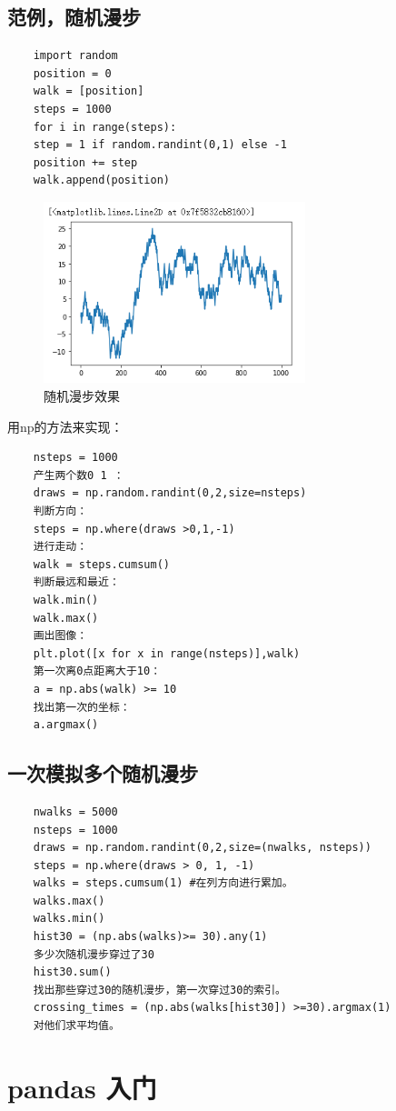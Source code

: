 \documentclass{article}
\begin{document}
\subsection{范例，随机漫步}
\begin{lstlisting}
	import random
	position = 0
	walk = [position]
	steps = 1000
	for i in range(steps):
	step = 1 if random.randint(0,1) else -1
	position += step
	walk.append(position)
\end{lstlisting}
	\begin{figure}[htpb]
		\centering
		\includegraphics[width=3in]{fig/np_9}
		\caption{随机漫步效果}
	\end{figure}
用np的方法来实现：
\begin{lstlisting}
	nsteps = 1000
	产生两个数0 1 ：
	draws = np.random.randint(0,2,size=nsteps)
	判断方向：
	steps = np.where(draws >0,1,-1)
	进行走动：
	walk = steps.cumsum()
	判断最远和最近：
	walk.min()
	walk.max()
	画出图像：
	plt.plot([x for x in range(nsteps)],walk)
	第一次离0点距离大于10：
	a = np.abs(walk) >= 10
	找出第一次的坐标：
	a.argmax()
\end{lstlisting}	

\subsection{一次模拟多个随机漫步}
\begin{lstlisting}
	nwalks = 5000
	nsteps = 1000
	draws = np.random.randint(0,2,size=(nwalks, nsteps))
	steps = np.where(draws > 0, 1, -1)
	walks = steps.cumsum(1) #在列方向进行累加。
	walks.max()
	walks.min()
	hist30 = (np.abs(walks)>= 30).any(1)
	多少次随机漫步穿过了30
	hist30.sum()
	找出那些穿过30的随机漫步，第一次穿过30的索引。
	crossing_times = (np.abs(walks[hist30]) >=30).argmax(1)
	对他们求平均值。
\end{lstlisting}

\section{pandas 入门}
\end{document}
